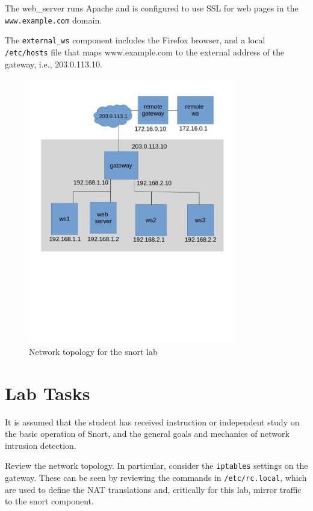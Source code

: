 The web\_server runs Apache and is configured to use SSL for web pages in the
{\tt www.example.com} domain.

The {\tt external\_ws} component includes the Firefox browser, and a local 
{\tt /etc/hosts} file that maps www.example.com to the external address of the
gateway, i.e., 203.0.113.10.


\begin{figure}[htb]
\begin{center}
\includegraphics [width=0.8\textwidth,natwidth=621,natheight=403]{snort.jpg}
\end{center}
\caption{Network topology for the snort lab}
\label{fig:topology}
\end{figure}

\section{Lab Tasks}
It is assumed that the student has received instruction or independent study on
the basic operation of Snort, and the general goals and mechanics of network intrusion detection.

Review the network topology.  In particular, consider the {\tt iptables} settings on the gateway.
These can be seen by reviewing the commands in {\tt /etc/rc.local}, which are used to
define the NAT translations and, critically for this lab, mirror traffic to the snort component. 

